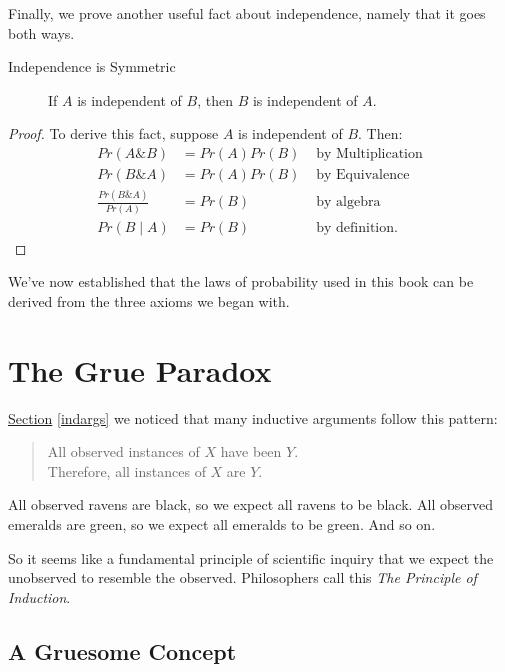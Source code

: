 \documentclass[justified]{tufte-book}
\newcommand{\given}{\mid}
\renewcommand{\wedge}{\mathbin{\&}}
\newcommand{\p}{Pr}
\newenvironment{argument}{\begin{quote}\normalsize}{\end{quote}}
\theoremstyle{definition}
\theoremstyle{definition}
\theoremstyle{definition}
\theoremstyle{remark}
\let\BeginKnitrBlock\begin \let\EndKnitrBlock\end
\begin{document}
Finally, we prove another useful fact about independence, namely that it goes both ways.

\begin{description}
\item[Independence is Symmetric]
If \(A\) is independent of \(B\), then \(B\) is independent of \(A\).
\end{description}

\BeginKnitrBlock{proof}
{}
To derive this fact, suppose \(A\) is independent of \(B\). Then:
\[
  \begin{aligned}
    \p(A \wedge B)               &= \p(A) \p(B) & \mbox{ by Multiplication}\\
    \p(B \wedge A)               &= \p(A) \p(B) & \mbox{ by Equivalence}\\
    \frac{\p(B \wedge A)}{\p(A)} &= \p(B)       & \mbox{ by algebra}\\
    \p(B \given A)               &= \p(B)       & \mbox{ by definition.}
  \end{aligned}
\]
\EndKnitrBlock{proof}

We've now established that the laws of probability used in this book can be derived from the three axioms we began with.

\hypertarget{grue}{%
\chapter{The Grue Paradox}\label{grue}}

 \protect\hyperlink{indargs}{Section} \ref{indargs} we noticed that many inductive arguments follow this pattern:

\begin{argument}
All observed instances of \(X\) have been \(Y\).\\
Therefore, all instances of \(X\) are \(Y\).
\end{argument}

All observed ravens are black, so we expect all ravens to be black. All observed emeralds are green, so we expect all emeralds to be green. And so on.

So it seems like a fundamental principle of scientific inquiry that we expect the unobserved to resemble the observed. Philosophers call this \emph{The Principle of Induction}.

\hypertarget{a-gruesome-concept}{%
\section*{A Gruesome Concept}\label{a-gruesome-concept}}
\end{document}
